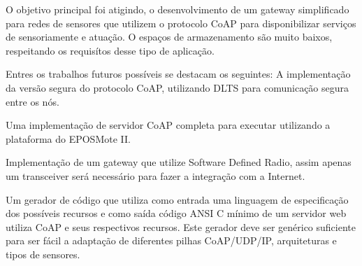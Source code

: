 O objetivo principal foi atigindo, o desenvolvimento de um gateway simplificado para redes de sensores que utilizem o protocolo CoAP para disponibilizar servi\c{c}os de sensoriamente e atua\c{c}\~ao. O espa\c{c}os de armazenamento s\~ao muito baixos, respeitando os requis\'itos desse tipo de aplica\c{c}\~ao.

Entres os trabalhos futuros poss\'iveis se destacam os seguintes:
A implementa\c{c}\~ao da vers\~ao segura do protocolo CoAP, utilizando DLTS para comunica\c{c}\~ao segura entre os n\'os.

Uma implementa\c{c}\~ao de servidor CoAP completa para executar utilizando a plataforma do EPOSMote II.

Implementa\c{c}\~ao de um gateway que utilize Software Defined Radio, assim apenas um transceiver ser\'a necess\'ario para
fazer a integra\c{c}\~ao com a Internet.

Um gerador de c\'odigo que utiliza como entrada uma linguagem de especifica\c{c}\~ao dos poss\'iveis recursos e como sa\'ida c\'odigo ANSI C m\'inimo de um servidor web utiliza CoAP e seus respectivos recursos. Este gerador deve ser gen\'erico suficiente para ser f\'acil a adapta\c{c}\~ao de diferentes pilhas CoAP/UDP/IP, arquiteturas e tipos de sensores.
